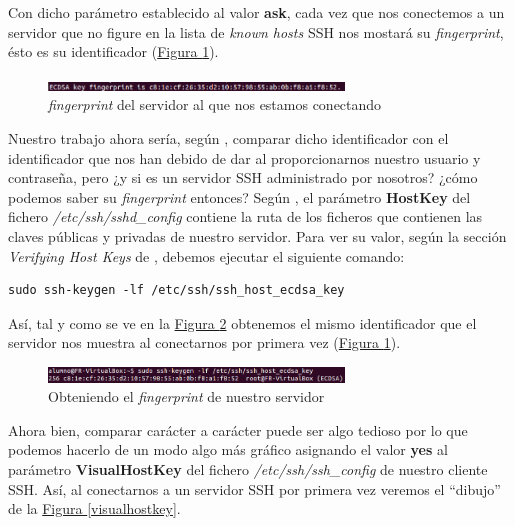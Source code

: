 \documentclass[10pt,a4paper,spanish]{article}
\begin{document}
Con dicho parámetro establecido al valor \textbf{ask}, cada vez que nos conectemos a un servidor que no figure en la lista de \textit{known hosts} SSH nos mostará su \textit{fingerprint}, ésto es su identificador (\hyperref[fingerprint]{Figura \ref*{fingerprint}}). 

\begin{figure}[!h]
    \centering
    \includegraphics[width=0.7\textwidth]{fingerprint}
    \caption{\textit{fingerprint} del servidor al que nos estamos conectando}
    \label{fingerprint}
\end{figure}

Nuestro trabajo ahora sería, según \cite{valenciano}, comparar dicho identificador con el identificador que nos han debido de dar al proporcionarnos nuestro usuario y contraseña, pero ¿y si es un servidor SSH administrado por nosotros? ¿cómo podemos saber su \textit{fingerprint} entonces? Según \cite{sshd}, el parámetro \textbf{HostKey} del fichero \textit{/etc/ssh/sshd\_config} contiene la ruta de los ficheros que contienen las claves públicas y privadas de nuestro servidor. Para ver su valor, según la sección \textit{Verifying Host Keys} de \cite{manssh}, debemos ejecutar el siguiente comando:

\begin{verbatim}
sudo ssh-keygen -lf /etc/ssh/ssh_host_ecdsa_key
\end{verbatim}

Así, tal y como se ve en la \hyperref[clave]{Figura \ref*{clave}} obtenemos el mismo identificador que el servidor nos muestra al conectarnos por primera vez (\hyperref[fingerprint]{Figura \ref*{fingerprint}}).

\begin{figure}[!h]
    \centering
    \includegraphics[width=0.7\textwidth]{clave}
    \caption{Obteniendo el \textit{fingerprint} de nuestro servidor}
    \label{clave}
\end{figure}

Ahora bien, comparar carácter a carácter puede ser algo tedioso por lo que podemos hacerlo de un modo algo más gráfico asignando el valor \textbf{yes} al parámetro \textbf{VisualHostKey} del fichero \textit{/etc/ssh/ssh\_config} de nuestro cliente SSH. Así, al conectarnos a un servidor SSH por primera vez veremos el ``dibujo'' de la \hyperref[visualhostkey]{Figura \ref*{visualhostkey}}.
\end{document}
